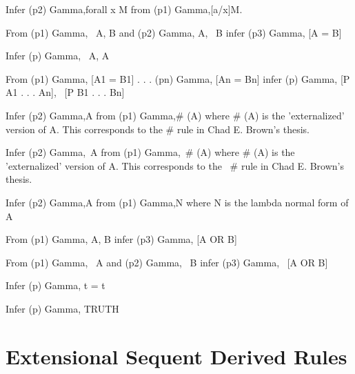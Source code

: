 \begin{description}
\item[EXTFUNC]  
Infer (p2) Gamma,forall x M from (p1) Gamma,[a/x]M.

\item[EXTO]  
From
(p1) Gamma, ~A, B
and
(p2) Gamma, A, ~B
infer
(p3) Gamma, [A = B]

\item[INIT]  
Infer (p) Gamma, ~A, A

\item[INITEQ]  
From
(p1) Gamma, [A1 = B1]
. . .
(pn) Gamma, [An = Bn]
infer
(p) Gamma, [P A1 . . . An], ~[P B1 . . . Bn]

\item[INTERNALIZE+]  
Infer (p2) Gamma,A from (p1) Gamma,\# (A) where \# (A) is the 'externalized' version of A.
This corresponds to the \#  rule in Chad E. Brown's thesis.

\item[INTERNALIZE-]  
Infer (p2) Gamma,~A from (p1) Gamma,~\# (A) where \# (A) is the 'externalized' version of A.
This corresponds to the ~\#  rule in Chad E. Brown's thesis.

\item[LAM]  
Infer (p2) Gamma,A from (p1) Gamma,N where N is the lambda normal form of A

\item[OR+]  
From
(p1) Gamma, A, B
infer
(p3) Gamma, [A OR B]

\item[OR-]  
From
(p1) Gamma, ~A
and
(p2) Gamma, ~B
infer
(p3) Gamma, ~[A OR B]

\item[REFL]  
Infer (p) Gamma, t = t

\item[TRUE+]  
Infer (p) Gamma, TRUTH
\item
\end{description}

\section{Extensional Sequent Derived Rules}

